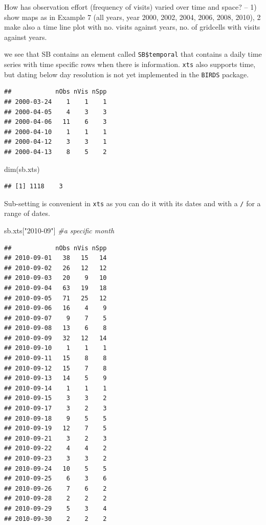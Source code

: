 \documentclass[
  10pt,
]{article}
\newenvironment{Shaded}{\begin{snugshade}}{\end{snugshade}}
\newcommand{\CommentTok}[1]{\textcolor[rgb]{0.56,0.35,0.01}{\textit{#1}}}
\newcommand{\FunctionTok}[1]{\textcolor[rgb]{0.00,0.00,0.00}{#1}}
\newcommand{\NormalTok}[1]{#1}
\newcommand{\OtherTok}[1]{\textcolor[rgb]{0.56,0.35,0.01}{#1}}
\newcommand{\SpecialCharTok}[1]{\textcolor[rgb]{0.00,0.00,0.00}{#1}}
\newcommand{\StringTok}[1]{\textcolor[rgb]{0.31,0.60,0.02}{#1}}
\begin{document}
How has observation effort (frequency of visits) varied over time and space? -- 1) show maps as in Example 7 (all years, year 2000, 2002, 2004, 2006, 2008, 2010), 2 make also a time line plot with no. visits against years, no. of gridcells with visits against years.

we see that SB contains an element called \texttt{SB\$temporal} that contains a daily time series with time specific rows when there is information. \texttt{xts} also supports time, but dating below day resolution is not yet implemented in the \texttt{BIRDS} package.

\begin{Shaded}
\end{Shaded}

\begin{verbatim}
##            nObs nVis nSpp
## 2000-03-24    1    1    1
## 2000-04-05    4    3    3
## 2000-04-06   11    6    3
## 2000-04-10    1    1    1
## 2000-04-12    3    3    1
## 2000-04-13    8    5    2
\end{verbatim}

\begin{Shaded}
\begin{Highlighting}[]
\FunctionTok{dim}\NormalTok{(sb.xts)}
\end{Highlighting}
\end{Shaded}

\begin{verbatim}
## [1] 1118    3
\end{verbatim}

Sub-setting is convenient in \texttt{xts} as you can do it with its dates and with a \texttt{/} for a range of dates.

\begin{Shaded}
\begin{Highlighting}[]
\NormalTok{sb.xts[}\StringTok{"2010{-}09"}\NormalTok{] }\CommentTok{\#a specific month}
\end{Highlighting}
\end{Shaded}

\begin{verbatim}
##            nObs nVis nSpp
## 2010-09-01   38   15   14
## 2010-09-02   26   12   12
## 2010-09-03   20    9   10
## 2010-09-04   63   19   18
## 2010-09-05   71   25   12
## 2010-09-06   16    4    9
## 2010-09-07    9    7    5
## 2010-09-08   13    6    8
## 2010-09-09   32   12   14
## 2010-09-10    1    1    1
## 2010-09-11   15    8    8
## 2010-09-12   15    7    8
## 2010-09-13   14    5    9
## 2010-09-14    1    1    1
## 2010-09-15    3    3    2
## 2010-09-17    3    2    3
## 2010-09-18    9    5    5
## 2010-09-19   12    7    5
## 2010-09-21    3    2    3
## 2010-09-22    4    4    2
## 2010-09-23    3    3    2
## 2010-09-24   10    5    5
## 2010-09-25    6    3    6
## 2010-09-26    7    6    2
## 2010-09-28    2    2    2
## 2010-09-29    5    3    4
## 2010-09-30    2    2    2
\end{verbatim}
\end{document}
